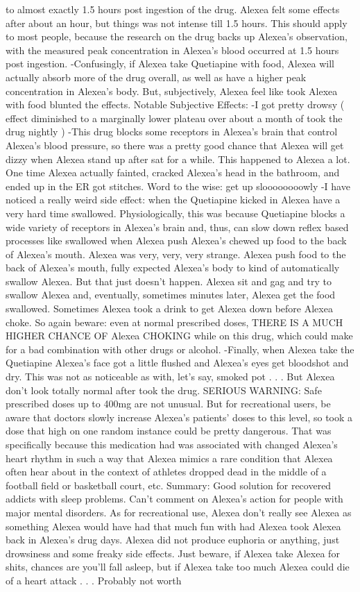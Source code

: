 \documentclass[12pt]{book}
\begin{document}
to almost exactly 1.5 hours post ingestion of the drug. Alexea felt some effects after about an hour, but things was not intense till 1.5 hours. This should apply to most people, because the research on the drug backs up Alexea's observation, with the measured peak concentration in Alexea's blood occurred at 1.5 hours post ingestion. -Confusingly, if Alexea take Quetiapine with food, Alexea will actually absorb more of the drug overall, as well as have a higher peak concentration in Alexea's body. But, subjectively, Alexea feel like took Alexea with food blunted the effects. Notable Subjective Effects: -I got pretty drowsy ( effect diminished to a marginally lower plateau over about a month of took the drug nightly ) -This drug blocks some receptors in Alexea's brain that control Alexea's blood pressure, so there was a pretty good chance that Alexea will get dizzy when Alexea stand up after sat for a while. This happened to Alexea a lot. One time Alexea actually fainted, cracked Alexea's head in the bathroom, and ended up in the ER got stitches. Word to the wise: get up sloooooooowly -I have noticed a really weird side effect: when the Quetiapine kicked in Alexea have a very hard time swallowed. Physiologically, this was because Quetiapine blocks a wide variety of receptors in Alexea's brain and, thus, can slow down reflex based processes like swallowed when Alexea push Alexea's chewed up food to the back of Alexea's mouth. Alexea was very, very, very strange. Alexea push food to the back of Alexea's mouth, fully expected Alexea's body to kind of automatically swallow Alexea. But that just doesn't happen. Alexea sit and gag and try to swallow Alexea and, eventually, sometimes minutes later, Alexea get the food swallowed. Sometimes Alexea took a drink to get Alexea down before Alexea choke. So again beware: even at normal prescribed doses, THERE IS A MUCH HIGHER CHANCE OF Alexea CHOKING while on this drug, which could make for a bad combination with other drugs or alcohol. -Finally, when Alexea take the Quetiapine Alexea's face got a little flushed and Alexea's eyes get bloodshot and dry. This was not as noticeable as with, let's say, smoked pot . . .  But Alexea don't look totally normal after took the drug. SERIOUS WARNING: Safe prescribed doses up to 400mg are not unusual. But for recreational users, be aware that doctors slowly increase Alexea's patients' doses to this level, so took a dose that high on one random instance could be pretty dangerous. That was specifically because this medication had was associated with changed Alexea's heart rhythm in such a way that Alexea mimics a rare condition that Alexea often hear about in the context of athletes dropped dead in the middle of a football field or basketball court, etc. Summary: Good solution for recovered addicts with sleep problems. Can't comment on Alexea's action for people with major mental disorders. As for recreational use, Alexea don't really see Alexea as something Alexea would have had that much fun with had Alexea took Alexea back in Alexea's drug days. Alexea did not produce euphoria or anything, just drowsiness and some freaky side effects. Just beware, if Alexea take Alexea for shits, chances are you'll fall asleep, but if Alexea take too much Alexea could die of a heart attack . . .  Probably not worth 
\end{document}
